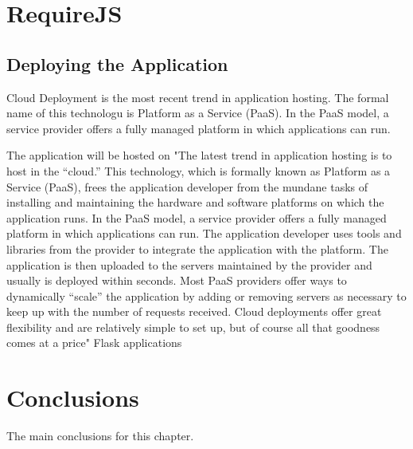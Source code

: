 \section{RequireJS}

\subsection{Deploying the Application}
Cloud Deployment is the most recent trend in application hosting. The formal name of this technologu is Platform as a Service (PaaS).  In the PaaS model, a service provider offers a fully managed platform in which applications can run.

The application will be hosted on 
"The latest trend in application hosting is to host in the “cloud.” This technology, which is formally known as Platform as a Service (PaaS), frees the application developer from the mundane tasks of installing and maintaining the hardware and software platforms on which the application runs. In the PaaS model, a service provider offers a fully managed platform in which applications can run. The application developer uses tools and libraries from the provider to integrate the application with the platform. The application is then uploaded to the servers maintained by the provider and usually is deployed within seconds. Most PaaS providers offer ways to dynamically “scale” the application by adding or removing servers as necessary to keep up with the number of requests received. Cloud deployments offer great flexibility and are relatively simple to set up, but of course all that goodness comes at a price" Flask applications

\section{Conclusions}

The main conclusions for this chapter.


